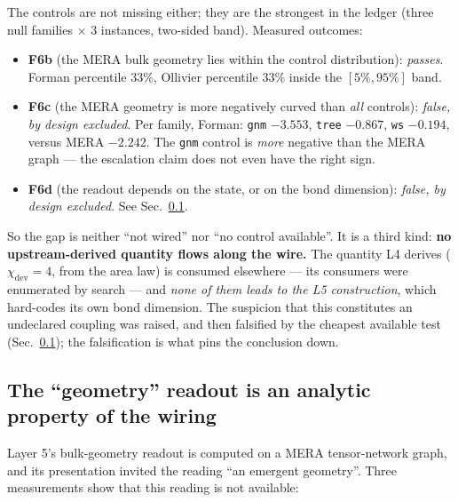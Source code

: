 \documentclass[11pt,a4paper]{article}
\newcommand{\code}[1]{\texttt{\small #1}}
\begin{document}
The controls are not missing either; they are the strongest in the ledger (three
null families $\times$ 3 instances, two-sided band). Measured outcomes:

\begin{itemize}[leftmargin=1.4em,itemsep=2pt]
  \item \textbf{F6b} (the MERA bulk geometry lies within the control distribution):
        \emph{passes}. Forman percentile $33\%$, Ollivier percentile $33\%$ inside
        the $[5\%,95\%]$ band.
  \item \textbf{F6c} (the MERA geometry is more negatively curved than \emph{all}
        controls): \emph{false, by design excluded}. Per family, Forman:
        \code{gnm} $-3.553$, \code{tree} $-0.867$, \code{ws} $-0.194$, versus MERA
        $-2.242$. The \code{gnm} control is \emph{more} negative than the MERA
        graph --- the escalation claim does not even have the right sign.
  \item \textbf{F6d} (the readout depends on the state, or on the bond dimension):
        \emph{false, by design excluded}. See Sec.~\ref{sec:l5geometry}.
\end{itemize}

\noindent So the gap is neither ``not wired'' nor ``no control available''. It is a
third kind: \textbf{no upstream-derived quantity flows along the wire.} The quantity
L4 derives ($\chi_{\text{dev}} = 4$, from the area law) is consumed elsewhere --- its
consumers were enumerated by search --- and \emph{none of them leads to the L5
construction}, which hard-codes its own bond dimension. The suspicion that this
constitutes an undeclared coupling was raised, and then falsified by the cheapest
available test (Sec.~\ref{sec:l5geometry}); the falsification is what pins the
conclusion down.

\subsection{The ``geometry'' readout is an analytic property of the wiring}
\label{sec:l5geometry}

Layer 5's bulk-geometry readout is computed on a MERA tensor-network graph, and its
presentation invited the reading ``an emergent geometry''. Three measurements show
that this reading is not available:
\end{document}
